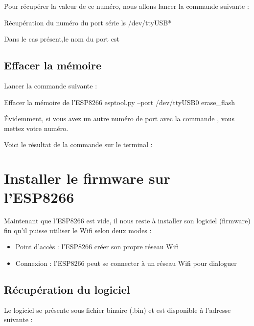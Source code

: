 Pour récupérer la valeur de ce numéro, nous allons lancer la commande suivante : 

\begin{Bash}{Récupération du numéro du port série}
ls /dev/ttyUSB*
\end{Bash}


Dans le cas présent,le nom du port est 

\section{Effacer la mémoire}

Lancer la commande suivante : 
\begin{Bash}{Effacer la mémoire de l'ESP8266}
esptool.py --port /dev/ttyUSB0 erase_flash
\end{Bash}

Évidemment, si vous avez un autre numéro de port avec la commande , vous mettez votre numéro.

Voici le résultat de la commande sur le terminal : 



\chapter{Installer le firmware sur \\l'ESP8266}

Maintenant que l'ESP8266 est vide, il nous reste à installer son logiciel (firmware) fin qu'il puisse utiliser le Wifi selon deux modes : 

\begin{itemize}
    \item Point d'accès : l'ESP8266 créer son propre réseau Wifi
    \item Connexion : l'ESP8266 peut se connecter à un réseau Wifi pour dialoguer
\end{itemize}

\section{Récupération du logiciel}

Le logiciel se présente sous fichier binaire (.bin) et est disponible à l'adresse suivante : \\

